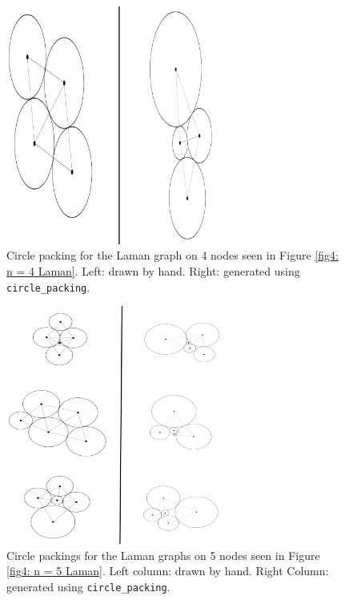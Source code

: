 \begin{figure}[htbp]
    \centering      
    \includegraphics[width = 0.7\textwidth]{Chapter 4/12. 4 circle.png} \hspace{1 cm}
    \caption{Circle packing for the Laman graph on 4 nodes seen in Figure \ref{fig4: n = 4 Laman}. Left: drawn by hand. Right: generated using \texttt{circle\_packing}.} 
    \label{fig4: 4 node packing}
\end{figure}

\begin{figure}[htbp]
    \centering
    \includegraphics[width = 0.7\textwidth]{Chapter 4/13. 5 circle.png}
    \caption{Circle packings for the Laman graphs on 5 nodes seen in Figure \ref{fig4: n = 5 Laman}. Left column: drawn by hand. Right Column: generated using \texttt{circle\_packing}.}
    \label{fig4: 5 node packing}
\end{figure}

